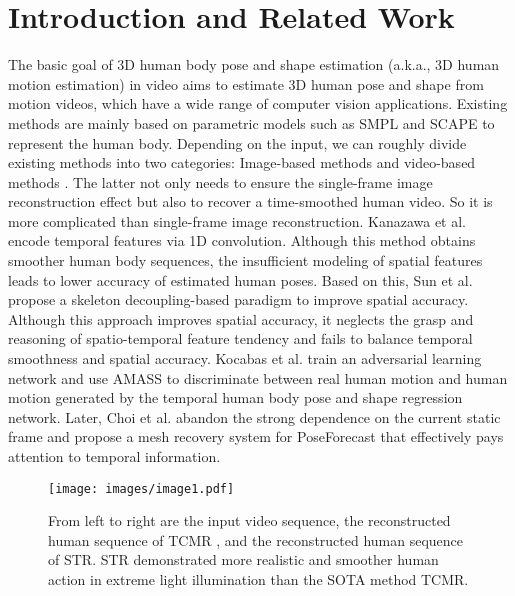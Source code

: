 \documentclass{bmvc2k}
\begin{document}
\section{Introduction and Related Work}
\label{sec:intro}
The basic goal of 3D human body pose and shape estimation (a.k.a., 3D human motion estimation) in video aims to estimate 3D human pose and shape from motion videos, which have a wide range of computer vision applications. Existing methods are mainly based on parametric models such as SMPL \cite{loper2015smpl} and SCAPE \cite{anguelov2005scape} to represent the human body. Depending on the input, we can roughly divide existing methods into two categories: Image-based methods \cite{kanazawa2018end, kolotouros2019learning, xu20213d} and video-based methods \cite{kanazawa2019learning, kocabas2020vibe, xu20213d, choi2021beyond}. The latter not only needs to ensure the single-frame image reconstruction effect but also to recover a time-smoothed human video. So it is more complicated than single-frame image reconstruction. Kanazawa et al. \cite{kanazawa2019learning} encode temporal features via 1D convolution. Although this method obtains smoother human body sequences, the insufficient modeling of spatial features leads to lower accuracy of estimated human poses. 
Based on this, Sun et al. \cite{sun2019human} propose a skeleton decoupling-based paradigm to improve spatial accuracy. Although this approach improves spatial accuracy, it neglects the grasp and reasoning of spatio-temporal feature tendency and fails to balance temporal smoothness and spatial accuracy. Kocabas et al. \cite{kocabas2020vibe} train an adversarial learning network and use AMASS \cite{mahmood2019amass} to discriminate between real human motion and human motion generated by the temporal human body pose and shape regression network. Later, Choi et al. \cite{choi2021beyond} abandon the strong dependence on the current static frame and propose a mesh recovery system for PoseForecast that effectively pays attention to temporal information.
\begin{figure*}
\centering
\texttt{[image: images/image1.pdf]}
\vspace{-0.5cm}
\caption{From left to right are the input video sequence, the reconstructed human sequence of TCMR \cite{choi2021beyond}, and the reconstructed human sequence of STR. STR demonstrated more realistic and smoother human action in extreme light illumination than the SOTA method TCMR.} \label{fig:image1}
\label{fig1}
\end{figure*}
\end{document}
